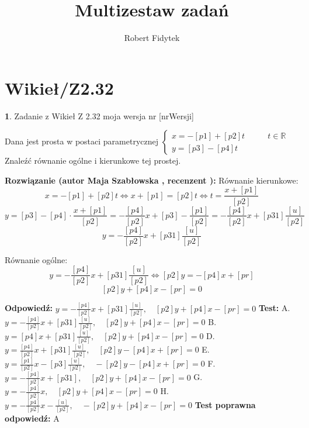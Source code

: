 \documentclass[12pt, a4paper]{article}
\title{Multizestaw zadań}
\author{Robert Fidytek}
\date{}
\theoremstyle{definition} %
\newtheorem{zad}{}
\newcommand{\kategoria}[1]{\section{#1}} %
\newcommand{\zadStart}[1]{\begin{zad}#1\newline} %
\newcommand{\zadStop}{\end{zad}}   %
\newcommand{\rozwStart}[2]{\noindent \textbf{Rozwiązanie (autor #1 , recenzent #2): }\newline} %
\newcommand{\rozwStop}{\newline}                                            %
\newcommand{\odpStart}{\noindent \textbf{Odpowiedź:}\newline}    %
\newcommand{\odpStop}{\newline}                                             %
\newcommand{\testStart}{\noindent \textbf{Test:}\newline} %
\newcommand{\testStop}{\newline} %
\newcommand{\kluczStart}{\noindent \textbf{Test poprawna odpowiedź:}\newline} %
\newcommand{\kluczStop}{\newline} %
\begin{document}
\maketitle


\kategoria{Wikieł/Z2.32}
\zadStart{Zadanie z Wikieł Z 2.32 moja wersja nr [nrWersji]}

Dana jest prosta w postaci parametrycznej $\left\{ \begin{array}{ll}
x=-[p1]+[p2]t & \quad \quad t\in\mathbb{R}\\
y=[p3]-[p4]t
\end{array} \right.$ Znaleźć równanie ogólne i kierunkowe tej prostej.

\zadStop

\rozwStart{Maja Szabłowska}{}
Równanie kierunkowe:
$$x=-[p1]+[p2]t \iff x+[p1]=[p2]t \iff t=\frac{x+[p1]}{[p2]}$$
$$y=[p3]-[p4]\cdot \frac{x+[p1]}{[p2]}=-\frac{[p4]}{[p2]}x+[p3]-\frac{[p1]}{[p2]}=-\frac{[p4]}{[p2]}x+[p31]\frac{[u]}{[p2]}$$
$$y=-\frac{[p4]}{[p2]}x+[p31]\frac{[u]}{[p2]}$$

Równanie ogólne:
$$y=-\frac{[p4]}{[p2]}x+[p31]\frac{[u]}{[p2]} \iff [p2]y=-[p4]x+[pr]$$
$$[p2]y+[p4]x-[pr]=0$$

\rozwStop


\odpStart
$y=-\frac{[p4]}{[p2]}x+[p31]\frac{[u]}{[p2]}, \quad [p2]y+[p4]x-[pr]=0$
\odpStop
\testStart
A.$y=-\frac{[p4]}{[p2]}x+[p31]\frac{[u]}{[p2]}, \quad [p2]y+[p4]x-[pr]=0$
B.$y=[p4]x+[p31]\frac{[u]}{[p2]}, \quad [p2]y+[p4]x-[pr]=0$
D.$y=\frac{[p4]}{[p2]}x+[p31]\frac{[u]}{[p2]}, \quad [p2]y-[p4]x+[pr]=0$
E.$y=\frac{[p1]}{[p2]}x-[p3]\frac{[u]}{[p2]}, \quad -[p2]y-[p4]x+[pr]=0$
F.$y=-\frac{[p4]}{[p2]}x+[p31], \quad [p2]y+[p4]x-[pr]=0$
G.$y=-\frac{[p4]}{[p2]}x, \quad [p2]y+[p4]x-[pr]=0$
H.$y=-\frac{[p4]}{[p2]}x-\frac{[u]}{[p2]}, \quad -[p2]y+[p4]x-[pr]=0$
\testStop
\kluczStart
A
\kluczStop
\end{document}
